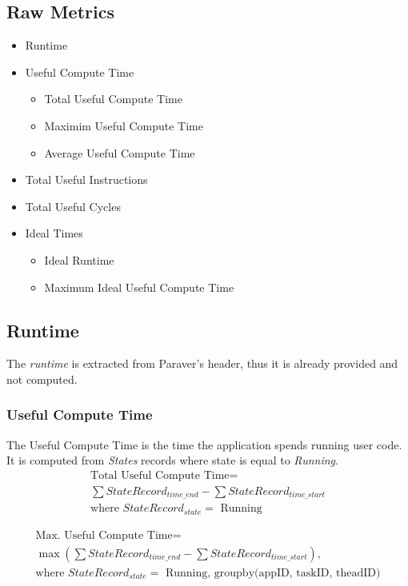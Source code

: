 \documentclass[article,12pt]{memoir}
\begin{document}
	\subsection{Raw Metrics}
	\begin{itemize}
		\item Runtime
		\item Useful Compute Time
		\begin{itemize}
			\item Total Useful Compute Time
			\item Maximim Useful Compute Time
			\item Average Useful Compute Time
		\end{itemize}
		\item Total Useful Instructions
		\item Total Useful Cycles
		\item Ideal Times
		\begin{itemize}
			\item Ideal Runtime
			\item Maximum Ideal Useful Compute Time
		\end{itemize}
	\end{itemize}
	
	\subsection{Runtime}
	The \textit{runtime} is extracted from Paraver's header, thus it is already provided and not computed.
	\subsubsection{Useful Compute Time}
	The Useful Compute Time is the time the application spends running user code. It is computed from \textit{States} records where state is equal to \textit{Running}.
	\begin{equation}\label{totustime}
		\begin{gathered}
			\text{Total Useful Compute Time} =\\
			\sum StateRecord_{time\_end} - \sum StateRecord_{time\_start}\\
			\text{where~$StateRecord_{state} =$ Running}
		\end{gathered}
	\end{equation}
	
	\begin{equation}\label{maxustime}
		\begin{gathered}
			\text{Max. Useful Compute Time} =\\
			\max(\sum StateRecord_{time\_end} - \sum StateRecord_{time\_start}),\\
			\text{where~$StateRecord_{state} =$ Running, groupby(appID, taskID, theadID)}
		\end{gathered}
	\end{equation}
\end{document}
